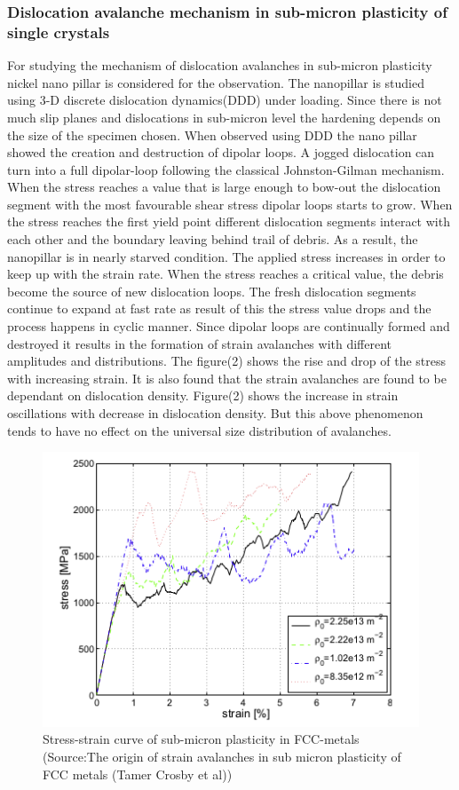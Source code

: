 \documentclass[a4paper,12pt]{article}
\begin{document}
\subsubsection{Dislocation avalanche mechanism in sub-micron plasticity of single crystals}
\indent\indent  For studying the mechanism of dislocation avalanches in sub-micron plasticity nickel nano pillar is considered for the observation. The nanopillar is studied using 3-D discrete dislocation dynamics(DDD) under loading. Since there is not much slip planes and dislocations in sub-micron level the hardening depends on the size of the specimen chosen. When observed using DDD the nano pillar showed the creation and destruction of dipolar loops. A jogged dislocation can turn into a full dipolar-loop following the classical Johnston-Gilman mechanism. When the stress reaches a value that is large enough to bow-out the dislocation segment with the most favourable shear stress dipolar loops starts to grow. When the stress reaches the first yield point different dislocation segments interact with each other and the boundary leaving behind trail of debris. As a result, the nanopillar is in nearly starved condition. The applied stress increases in order to keep up with the strain rate. When the stress reaches a critical value, the debris become the source of new dislocation loops. The fresh dislocation segments continue to expand at fast rate as result of this the stress value drops and the process happens in cyclic manner. Since dipolar loops are continually formed and destroyed it results in the formation of strain avalanches with different amplitudes and distributions. The figure(2) shows the rise and drop of the stress with increasing strain. It is also found that the strain avalanches are found to be dependant on dislocation density. Figure(2) shows the increase in strain oscillations with decrease in dislocation density. But this above phenomenon tends to have no effect on the universal size distribution of avalanches.
\begin{figure}[htbp]
  \centering
  \includegraphics[width=1\textwidth]{./2.png}
  \caption{Stress-strain curve of sub-micron plasticity in FCC-metals (Source:The origin of strain avalanches in sub micron plasticity of FCC metals (Tamer Crosby et al))}
\end{figure} 
\end{document}
